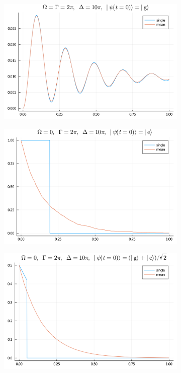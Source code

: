 \documentclass[hyperref, a4paper]{article}
\begin{document}
\begin{figure}
\begin{subfigure}{0.45\textwidth}
        \subcaption{}
    \end{subfigure}
    \begin{subfigure}{0.45\textwidth}
        \includegraphics[width=\textwidth]{rwf-3.png}
        \subcaption{}
    \end{subfigure}
    \begin{subfigure}{0.45\textwidth}
        \includegraphics[width=\textwidth]{rwf-4.png}
        \subcaption{}
    \end{subfigure}
    \begin{subfigure}{0.45\textwidth}
        \includegraphics[width=\textwidth]{rwf-5.png}

\end{subfigure}
\end{figure}
\end{document}
